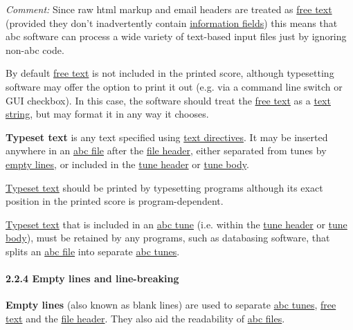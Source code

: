 \documentclass[oneside]{book}
\let\oldparagraph\paragraph
\renewcommand{\paragraph}[1]{\oldparagraph{#1}\mbox{}}
\begin{document}
\emph{Comment:} Since raw html markup and email headers are treated as
\protect\hyperlink{free_text_definition}{free text} (provided they don't
inadvertently contain
\protect\hyperlink{information_field_definition}{information fields})
this means that abc software can process a wide variety of text-based
input files just by ignoring non-abc code.

By default \protect\hyperlink{free_text_definition}{free text} is not
included in the printed score, although typesetting software may offer
the option to print it out (e.g. via a command line switch or GUI
checkbox). In this case, the software should treat the
\protect\hyperlink{free_text_definition}{free text} as a
\protect\hyperlink{text_string_definition}{text string}, but may format
it in any way it chooses.

\href{}{}\textbf{Typeset text} is any text specified using
\protect\hyperlink{text_directives}{text directives}. It may be inserted
anywhere in an \protect\hyperlink{abc_file_definition}{abc file} after
the \protect\hyperlink{file_header_definition}{file header}, either
separated from tunes by \protect\hyperlink{empty_line_definition}{empty
lines}, or included in the
\protect\hyperlink{tune_header_definition}{tune header} or
\protect\hyperlink{tune_body_definition}{tune body}.

\protect\hyperlink{typeset_text_definition}{Typeset text} should be
printed by typesetting programs although its exact position in the
printed score is program-dependent.

\protect\hyperlink{typeset_text_definition}{Typeset text} that is
included in an \protect\hyperlink{abc_tune_definition}{abc tune} (i.e.
within the \protect\hyperlink{tune_header_definition}{tune header} or
\protect\hyperlink{tune_body_definition}{tune body}), must be retained
by any programs, such as databasing software, that splits an
\protect\hyperlink{abc_file_definition}{abc file} into separate
\protect\hyperlink{abc_tune_definition}{abc tunes}.

\hypertarget{empty_lines_and_line-breaking}{\paragraph{2.2.4 Empty lines
and line-breaking}\label{empty_lines_and_line-breaking}}

\href{}{}\textbf{Empty lines} (also known as blank lines) are used to
separate \protect\hyperlink{abc_tune_definition}{abc tunes},
\protect\hyperlink{free_text_definition}{free text} and the
\protect\hyperlink{file_header_definition}{file header}. They also aid
the readability of \protect\hyperlink{abc_file_definition}{abc files}.
\end{document}
